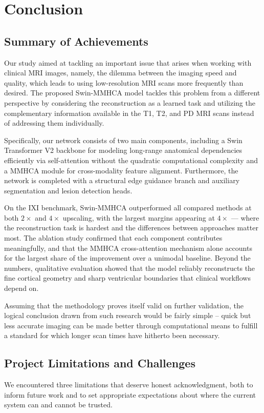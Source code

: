 \chapter{Conclusion}

\section{Summary of Achievements}
Our study aimed at tackling an important issue that arises when working with clinical MRI images, namely, the dilemma between the imaging speed and quality, which leads to using low-resolution MRI scans more frequently than desired. The proposed Swin-MMHCA model tackles this problem from a different perspective by considering the reconstruction as a learned task and utilizing the complementary information available in the T1, T2, and PD MRI scans instead of addressing them individually.

Specifically, our network consists of two main components, including a Swin Transformer V2 backbone for modeling long-range anatomical dependencies efficiently via self-attention without the quadratic computational complexity and a MMHCA module for cross-modality feature alignment. Furthermore, the network is completed with a structural edge guidance branch and auxiliary segmentation and lesion detection heads.

On the IXI benchmark, Swin-MMHCA outperformed all compared methods at both $2\times$ and $4\times$ upscaling, with the largest margins appearing at $4\times$ — where the reconstruction task is hardest and the differences between approaches matter most. The ablation study confirmed that each component contributes meaningfully, and that the MMHCA cross-attention mechanism alone accounts for the largest share of the improvement over a unimodal baseline. Beyond the numbers, qualitative evaluation showed that the model reliably reconstructs the fine cortical geometry and sharp ventricular boundaries that clinical workflows depend on.

Assuming that the methodology proves itself valid on further validation, the logical conclusion drawn from such research would be fairly simple – quick but less accurate imaging can be made better through computational means to fulfill a standard for which longer scan times have hitherto been necessary.

\section{Project Limitations and Challenges}
We encountered three limitations that deserve honest acknowledgment, both to inform future work and to set appropriate expectations about where the current system can and cannot be trusted.

